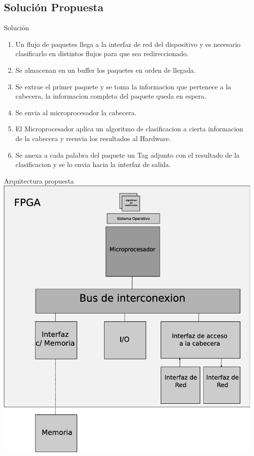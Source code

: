 \documentclass[xcolor=dvipsnames]{beamer}
\begin{document}
\subsection{Solución Propuesta}
\begin{frame}{Solución}

    \begin{enumerate}
      \scriptsize
 \pause     	\item Un flujo de paquetes llega a la interfaz de red del dispositivo y es necesario clasificarlo en distintos flujos para que sea redireccionado.
\pause 	\item Se almacenan en un buffer los paquetes en orden de llegada.
\pause 	\item Se extrae el primer paquete y se toma la informacion que pertenece a la cabecera, la informacion completa del paquete queda en espera.
\pause 	\item Se envia al microprocesador la cabecera. 
\pause 	\item El Microprocesador aplica un algoritmo de clasificacion a cierta informacion de la cabecera y reenvia los resultados al Hardware. 
\pause 	\item Se anexa a cada palabra del paquete un Tag adjunto con el resultado de la clasificacion y se lo envia hacia la interfaz de salida.
    \end{enumerate}

\end{frame}

\begin{frame}{Arquitectura propuesta}
   \center 
   \includegraphics[scale=0.25]{figures/solucion.eps}
\end{frame}
\end{document}
